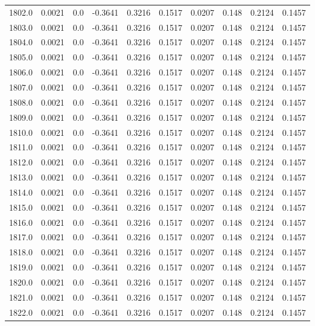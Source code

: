 \begin{longtable}{lrrrrrrrrr}
1802.0 & 0.0021 & 0.0 & -0.3641 & 0.3216 & 0.1517 & 0.0207 & 0.148 & 0.2124 & 0.1457 \\
1803.0 & 0.0021 & 0.0 & -0.3641 & 0.3216 & 0.1517 & 0.0207 & 0.148 & 0.2124 & 0.1457 \\
1804.0 & 0.0021 & 0.0 & -0.3641 & 0.3216 & 0.1517 & 0.0207 & 0.148 & 0.2124 & 0.1457 \\
1805.0 & 0.0021 & 0.0 & -0.3641 & 0.3216 & 0.1517 & 0.0207 & 0.148 & 0.2124 & 0.1457 \\
1806.0 & 0.0021 & 0.0 & -0.3641 & 0.3216 & 0.1517 & 0.0207 & 0.148 & 0.2124 & 0.1457 \\
1807.0 & 0.0021 & 0.0 & -0.3641 & 0.3216 & 0.1517 & 0.0207 & 0.148 & 0.2124 & 0.1457 \\
1808.0 & 0.0021 & 0.0 & -0.3641 & 0.3216 & 0.1517 & 0.0207 & 0.148 & 0.2124 & 0.1457 \\
1809.0 & 0.0021 & 0.0 & -0.3641 & 0.3216 & 0.1517 & 0.0207 & 0.148 & 0.2124 & 0.1457 \\
1810.0 & 0.0021 & 0.0 & -0.3641 & 0.3216 & 0.1517 & 0.0207 & 0.148 & 0.2124 & 0.1457 \\
1811.0 & 0.0021 & 0.0 & -0.3641 & 0.3216 & 0.1517 & 0.0207 & 0.148 & 0.2124 & 0.1457 \\
1812.0 & 0.0021 & 0.0 & -0.3641 & 0.3216 & 0.1517 & 0.0207 & 0.148 & 0.2124 & 0.1457 \\
1813.0 & 0.0021 & 0.0 & -0.3641 & 0.3216 & 0.1517 & 0.0207 & 0.148 & 0.2124 & 0.1457 \\
1814.0 & 0.0021 & 0.0 & -0.3641 & 0.3216 & 0.1517 & 0.0207 & 0.148 & 0.2124 & 0.1457 \\
1815.0 & 0.0021 & 0.0 & -0.3641 & 0.3216 & 0.1517 & 0.0207 & 0.148 & 0.2124 & 0.1457 \\
1816.0 & 0.0021 & 0.0 & -0.3641 & 0.3216 & 0.1517 & 0.0207 & 0.148 & 0.2124 & 0.1457 \\
1817.0 & 0.0021 & 0.0 & -0.3641 & 0.3216 & 0.1517 & 0.0207 & 0.148 & 0.2124 & 0.1457 \\
1818.0 & 0.0021 & 0.0 & -0.3641 & 0.3216 & 0.1517 & 0.0207 & 0.148 & 0.2124 & 0.1457 \\
1819.0 & 0.0021 & 0.0 & -0.3641 & 0.3216 & 0.1517 & 0.0207 & 0.148 & 0.2124 & 0.1457 \\
1820.0 & 0.0021 & 0.0 & -0.3641 & 0.3216 & 0.1517 & 0.0207 & 0.148 & 0.2124 & 0.1457 \\
1821.0 & 0.0021 & 0.0 & -0.3641 & 0.3216 & 0.1517 & 0.0207 & 0.148 & 0.2124 & 0.1457 \\
1822.0 & 0.0021 & 0.0 & -0.3641 & 0.3216 & 0.1517 & 0.0207 & 0.148 & 0.2124 & 0.1457 \\

\end{longtable}
